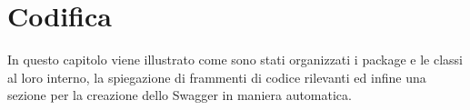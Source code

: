 \chapter{Codifica}
\label{cap:codifica}

In questo capitolo viene illustrato come sono stati organizzati i package e le classi al loro interno, la spiegazione di frammenti di codice rilevanti ed infine una sezione per la creazione dello Swagger in maniera automatica.\\








